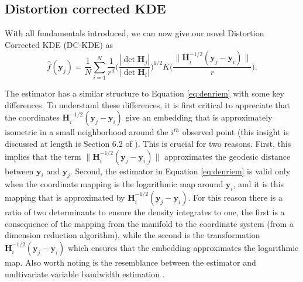 \documentclass[11pt,a4paper,]{article}
\begin{document}
\hypertarget{DCKDE}{%
\subsection{Distortion corrected KDE}\label{DCKDE}}

With all fundamentals introduced, we can now give our novel Distortion Corrected KDE (DC-KDE) as
\begin{equation}
\label{eq:denestimator}
\hat{f}(\pmb{y}_j) = \frac{1}{N} \sum_{i=1}^{N} \frac{1}{r^d} \bigg(\frac{|\det \pmb{H}_j|}{|\det \pmb{H}_i|} \bigg)^{1/2} K\bigg( \frac{\| \pmb{H}^{-1/2}_i (\pmb{y}_j - \pmb{y}_i)\|}{r} \bigg).
\end{equation}

The estimator has a similar structure to Equation \eqref{eq:denriem} with some key differences. To understand these differences, it is first critical to appreciate that the coordinates \(\pmb{H}^{-1/2}_i (\pmb{y}_j - \pmb{y}_i)\) give an embedding that is approximately isometric in a small neighborhood around the \(i^{th}\) observed point (this insight is discussed at length is Section 6.2 of \textcite{Perrault-Joncas2013-pq}). This is crucial for two reasons. First, this implies that the term \(\| \pmb{H}^{-1/2}_i (\pmb{y}_j - \pmb{y}_i)\|\) approximates the geodesic distance between \(\pmb{y}_i\) and \(\pmb{y}_j\). Second, the estimator in Equation \eqref{eq:denriem} is valid only when the coordinate mapping is the logarithmic map around \(\pmb{y}_i\), and it is this mapping that is approximated by \(\pmb{H}^{-1/2}_i (\pmb{y}_j - \pmb{y}_i)\). For this reason there is a ratio of two determinants to ensure the density integrates to one, the first is a consequence of the mapping from the manifold to the coordinate system (from a dimension reduction algorithm), while the second is the transformation \(\pmb{H}^{-1/2}_i (\pmb{y}_j - \pmb{y}_i)\) which ensures that the embedding approximates the logarithmic map. Also worth noting is the resemblance between the estimator and multivariate variable bandwidth estimation \autocite{Breiman1977-qc,Jones1990-oe,Terrell1992-ut}.
\end{document}
